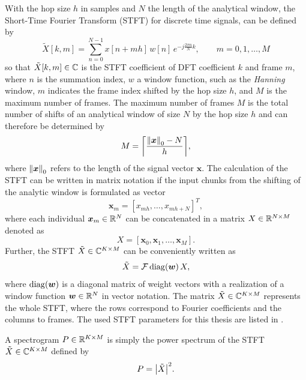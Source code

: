 With the hop size $h$ in samples and $N$ the length of the analytical window, the Short-Time Fourier Transform (STFT) for discrete time signals, can be defined by
\begin{equation}\label{eq:signal_spec_stft}
  \tilde{X}[k, m] = \sum_{n=0}^{N-1} x[n + m h] \, w[n] \, e^{-j\frac{2 \pi n}{N}k}, \qquad m = 0, 1, \dots, M
\end{equation}
so that $\tilde{X}[k, m] \in \mathbb{C}$ is the STFT coefficient of DFT coefficient $k$ and frame $m$, where $n$ is the summation index, $w$ a window function, such as the \emph{Hanning} window, $m$ indicates the frame index shifted by the hop size $h$, and $M$ is the maximum number of frames.
The maximum number of frames $M$ is the total number of shifts of an analytical window of size $N$ by the hop size $h$ and can therefore be determined by
\begin{equation}\label{eq:signal_spec_hop}
  M = \ceil*{\frac{\norm{\bm{x}}_0-N}{h}},
\end{equation}
where $\norm{\bm{x}}_0$ refers to the length of the signal vector $\bm{x}$.
The calculation of the STFT can be written in matrix notation if the input chunks from the shifting of the analytic window is formulated as vector
\begin{equation}
  \bm{x}_m = [x_{m h}, \dots, x_{m h+N}]^T,
\end{equation}
where each individual $\bm{x}_m \in \mathbb{R}^N$ can be concatenated in a matrix $X \in \mathbb{R}^{N \times M}$ denoted as
\begin{equation}
  X = [\bm{x}_0, \bm{x}_1, \dots, \bm{x}_M].
\end{equation}
Further, the STFT $\tilde{X} \in \mathbb{C}^{K \times M}$ can be conveniently written as
\begin{equation}\label{eq:signal_spec_stft_matrix}
  \tilde{X} = \mathcal{F} \mathop{\mathrm{diag}(\bm{w})} X,
\end{equation}
where $\mathop{\mathrm{diag}(\bm{w})}$ is a diagonal matrix of weight vectors with a realization of a window function $\bm{w} \in \mathbb{R}^N$ in vector notation.
The matrix $\tilde{X} \in \mathbb{C}^{K \times M}$ represents the whole STFT, where the rows correspond to Fourier coefficients and the columns to frames.
The used STFT parameters for this thesis are listed in .

A spectrogram $P \in \mathbb{R}^{K \times M}$ is simply the power spectrum of the STFT $\tilde{X} \in \mathbb{C}^{K \times M}$ defined by
\begin{equation}\label{eq:signal_spec_spec}
  P = \abs{\tilde{X}}^2.
\end{equation}

